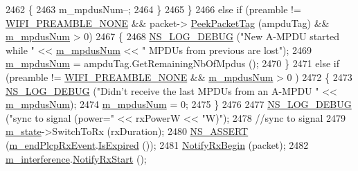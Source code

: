 \begin{DoxyCode}
2462                 \{
2463                   m\_mpdusNum--;
2464                 \}
2465             \}
2466           \textcolor{keywordflow}{else} \textcolor{keywordflow}{if} (preamble != \hyperlink{group__wifi_gga5e94a56cb338a14ffbbb19c6a41251eba97c5c71995de5f28931200e6d5a38a66}{WIFI\_PREAMBLE\_NONE} && packet->
      \hyperlink{classns3_1_1Packet_a1734de11f2ca1e78a7872461a0625168}{PeekPacketTag} (ampduTag) && \hyperlink{classns3_1_1WifiPhy_aea15140c77315a8bf71eff068ea6570e}{m\_mpdusNum} > 0)
2467             \{
2468               \hyperlink{group__logging_ga413f1886406d49f59a6a0a89b77b4d0a}{NS\_LOG\_DEBUG} (\textcolor{stringliteral}{"New A-MPDU started while "} << 
      \hyperlink{classns3_1_1WifiPhy_aea15140c77315a8bf71eff068ea6570e}{m\_mpdusNum} << \textcolor{stringliteral}{" MPDUs from previous are lost"});
2469               \hyperlink{classns3_1_1WifiPhy_aea15140c77315a8bf71eff068ea6570e}{m\_mpdusNum} = ampduTag.GetRemainingNbOfMpdus ();
2470             \}
2471           \textcolor{keywordflow}{else} \textcolor{keywordflow}{if} (preamble != \hyperlink{group__wifi_gga5e94a56cb338a14ffbbb19c6a41251eba97c5c71995de5f28931200e6d5a38a66}{WIFI\_PREAMBLE\_NONE} && 
      \hyperlink{classns3_1_1WifiPhy_aea15140c77315a8bf71eff068ea6570e}{m\_mpdusNum} > 0 )
2472             \{
2473               \hyperlink{group__logging_ga413f1886406d49f59a6a0a89b77b4d0a}{NS\_LOG\_DEBUG} (\textcolor{stringliteral}{"Didn't receive the last MPDUs from an A-MPDU "} << 
      \hyperlink{classns3_1_1WifiPhy_aea15140c77315a8bf71eff068ea6570e}{m\_mpdusNum});
2474               \hyperlink{classns3_1_1WifiPhy_aea15140c77315a8bf71eff068ea6570e}{m\_mpdusNum} = 0;
2475             \}
2476 
2477           \hyperlink{group__logging_ga413f1886406d49f59a6a0a89b77b4d0a}{NS\_LOG\_DEBUG} (\textcolor{stringliteral}{"sync to signal (power="} << rxPowerW << \textcolor{stringliteral}{"W)"});
2478           \textcolor{comment}{//sync to signal}
2479           \hyperlink{classns3_1_1WifiPhy_a020dae8902d858e3d121aa7a67ca2528}{m\_state}->SwitchToRx (rxDuration);
2480           \hyperlink{assert_8h_a6dccdb0de9b252f60088ce281c49d052}{NS\_ASSERT} (\hyperlink{classns3_1_1WifiPhy_a82a8c191494752dc220bc3df57ea29cd}{m\_endPlcpRxEvent}.\hyperlink{classns3_1_1EventId_a5c30c92e7c1c34b4e8505cc07ed71b02}{IsExpired} ());
2481           \hyperlink{classns3_1_1WifiPhy_a9a8f2c1e72c030fd8174c7a65fd5907d}{NotifyRxBegin} (packet);
2482           \hyperlink{classns3_1_1WifiPhy_a55909109ad2e2759702336770fa90119}{m\_interference}.\hyperlink{classns3_1_1InterferenceHelper_a881195405f028805df1890088735e0f3}{NotifyRxStart} ();

\end{DoxyCode}
